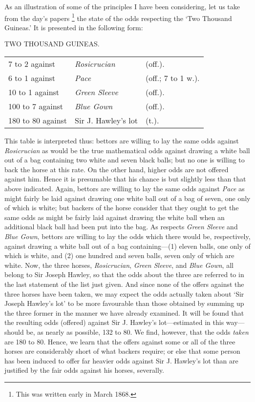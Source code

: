 \documentclass[letterpaper,12pt,oneside,openany]{memoir}
\begin{document}
As an illustration of some of the principles I have
been considering, let us take from the day's papers%
\footnote{This was written early in March 1868.}
the state of the odds respecting the `Two Thousand
Guineas.' It is presented in the following form:

\begin{center}
TWO THOUSAND GUINEAS.\\[2mm]
\begin{tabular}{lll}
7 to 2 against &\textit{Rosicrucian} &(off.).\\
6 to 1 against &\textit{Pace} &(off.; 7 to 1 w.).\\
10 to 1 against &\textit{Green Sleeve} &(off.).\\
100 to 7 against &\textit{Blue Gown} &(off.).\\
180 to 80 against &Sir J. Hawley's lot &(t.).
\end{tabular}
\end{center}

This table is interpreted thus: bettors are willing to
lay the same odds against \textit{Rosicrucian} as would be the
true mathematical odds against drawing a white ball
out of a bag containing two white and seven black
balls; but no one is willing to back the horse at this
rate. On the other hand, higher odds are not offered
against him. Hence it is presumable that his chance
is but slightly less than that above indicated. Again,
bettors are willing to lay the same odds against \textit{Pace}
as might fairly be laid against drawing one white ball
out of a bag of seven, one only of which is white; but
backers of the horse consider that they ought to get
the same odds as might be fairly laid against drawing
the white ball when an additional black ball had been
put into the bag. As respects \emph{Green Sleeve} and \emph{Blue
Gown}, bettors are willing to lay the odds which there
would be, respectively, against drawing a white ball
out of a bag containing---(1) eleven balls, one only of
which is white, and (2) one hundred and seven balls,
seven only of which are white. Now, the three horses,
\emph{Rosicrucian}, \emph{Green Sleeve}, and \emph{Blue Gown}, all belong
to Sir Joseph Hawley, so that the odds about the
three are referred to in the last statement of the list
just given. And since none of the offers against the
three horses have been taken, we may expect the odds
actually taken about `Sir Joseph Hawley's lot' to be
more favourable than those obtained by summing
up the three former in the manner we have already
examined. It will be found that the resulting odds
(offered) against Sir J. Hawley's lot---estimated in
this way---should be, as nearly as possible, 132 to 80.
We find, however, that the odds \emph{taken} are 180 to 80.
Hence, we learn that the offers against some or all of
the three horses are considerably short of what backers
require; or else that some person has been induced
to offer far heavier odds against Sir J. Hawley's lot
than are justified by the fair odds against his horses,
severally.
\end{document}
